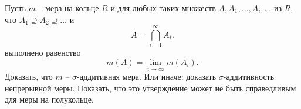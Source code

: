 \begin{task}{5}
Пусть $m$ -- мера на кольце $R$ и для любых таких множеств $A, A_1, \ldots, A_i, \ldots$ из $R$, что $A_1 \supseteq A_2 \supseteq \ldots$ и
\[
A = \bigcap_{i = 1}^{\infty}A_i.
\]
выполнено равенство
\[
m(A) = \lim\limits_{i \to \infty}m(A_i).
\]
Доказать, что $m$ -- $\sigma$-аддитивная мера. Или иначе: доказать $\sigma$-аддитивность непрерывной меры.\newline
Показать, что это утверждение может не быть справедливым для меры на полукольце. 
\end{task}
\begin{solution}

\end{solution}